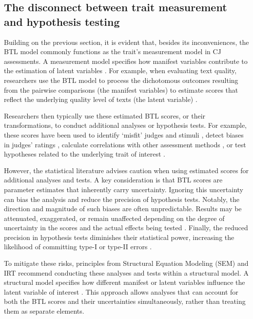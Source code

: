 \documentclass[
  authoryear,
  preprint,
  1p]{elsarticle}
\begin{document}
\subsection{The disconnect between trait measurement and hypothesis
testing}\label{sec-theory-issue2}

Building on the previous section, it is evident that, besides its
inconveniences, the BTL model commonly functions as the trait's
measurement model in CJ assessments. A measurement model specifies how
manifest variables contribute to the estimation of latent variables
\citep{Everitt_et_al_2010}. For example, when evaluating text quality,
researchers use the BTL model to process the dichotomous outcomes
resulting from the pairwise comparisons (the manifest variables) to
estimate scores that reflect the underlying quality level of texts (the
latent variable)
\citep{Laming_2004, Pollitt_2012b, Whitehouse_2012, vanDaal_et_al_2016, Lesterhuis_2018_thesis, Coertjens_et_al_2017, Goossens_et_al_2018, Bouwer_et_al_2023}.

Researchers then typically use these estimated BTL scores, or their
transformations, to conduct additional analyses or hypothesis tests. For
example, these scores have been used to identify `misfit' judges and
stimuli \citep{Pollitt_2012b, vanDaal_et_al_2016, Goossens_et_al_2018},
detect biases in judges' ratings
\citep{Pollitt_et_al_2003, Pollitt_2012b}, calculate correlations with
other assessment methods \citep{Goossens_et_al_2018, Bouwer_et_al_2023},
or test hypotheses related to the underlying trait of interest
\citep{Bramley_et_al_2019, Boonen_et_al_2020, Bouwer_et_al_2023, vanDaal_et_al_2017, Jones_et_al_2019, Gijsen_et_al_2021}.

However, the statistical literature advises caution when using estimated
scores for additional analyses and tests. A key consideration is that
BTL scores are parameter estimates that inherently carry uncertainty.
Ignoring this uncertainty can bias the analysis and reduce the precision
of hypothesis tests. Notably, the direction and magnitude of such biases
are often unpredictable. Results may be attenuated, exaggerated, or
remain unaffected depending on the degree of uncertainty in the scores
and the actual effects being tested
\citetext{\citealp[pp.~25]{Kline_et_al_2023}; \citealp[pp.~137]{Hoyle_et_al_2023}}.
Finally, the reduced precision in hypothesis tests diminishes their
statistical power, increasing the likelihood of committing type-I or
type-II errors \citep{McElreath_2020}.

To mitigate these risks, principles from Structural Equation Modeling
(SEM) \citep[pp.~138]{Hoyle_et_al_2023} and IRT
\citetext{\citealp[chap.~6]{Fox_2010}; \citealp[chap.~24]{vanderLinden_et_al_2017_I}}
recommend conducting these analyses and tests within a structural model.
A structural model specifies how different manifest or latent variables
influence the latent variable of interest \citep{Everitt_et_al_2010}.
This approach allows analyses that can account for both the BTL scores
and their uncertainties simultaneously, rather than treating them as
separate elements.
\end{document}
